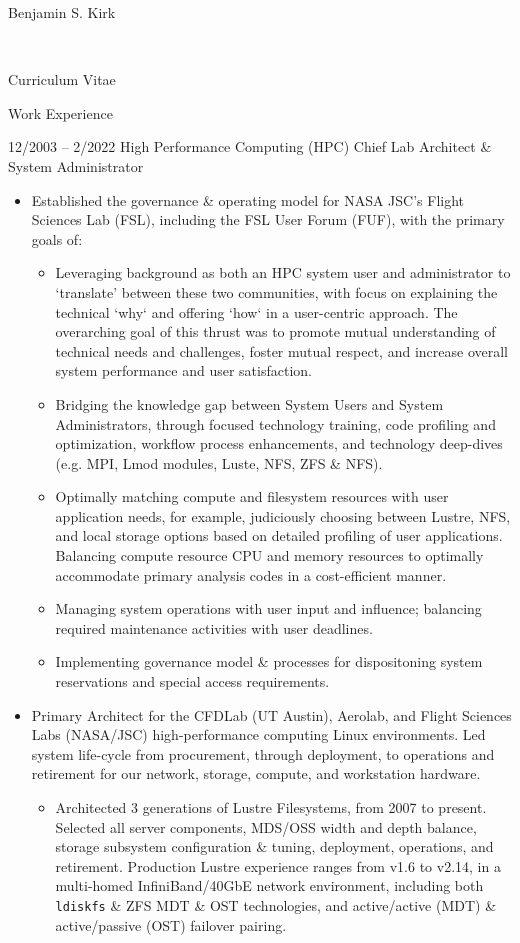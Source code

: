 \documentclass[10pt]{report}
\begin{document}
\begin{cv}{\centerline{\Large Benjamin S. Kirk}\\
    \centerline{\large Curriculum Vitae}}
\begin{cvlist}{Work Experience}
  \item[12/2003 -- 2/2022]
    High Performance Computing (HPC) Chief Lab Architect \& System Administrator
    \begin{itemize}
      \item
        Established the governance \& operating model for NASA JSC's Flight  Sciences Lab (FSL), including the FSL User Forum (FUF), with the primary goals of:
        \begin{itemize}
        \item
          Leveraging background as both an HPC system user and administrator to `translate' between these two communities, with focus on explaining the technical `why` and offering `how` in a user-centric approach. The overarching goal of this thrust was to promote mutual understanding of technical needs and challenges, foster mutual respect, and increase overall system performance and user satisfaction.
        \item
          Bridging the knowledge gap between System Users and System Administrators, through focused technology training, code profiling and optimization, workflow process enhancements, and technology deep-dives (e.g. MPI, Lmod modules, Luste, NFS, ZFS \& NFS).
        \item
          Optimally matching compute and filesystem resources with user application needs, for example, judiciously choosing between Lustre, NFS, and local storage options based on detailed profiling of user applications.  Balancing compute resource CPU and memory resources to optimally accommodate primary analysis codes in a cost-efficient manner.
        \item
          Managing system operations with user input and influence; balancing required maintenance activities with user deadlines.
        \item
          Implementing governance model \& processes for dispositoning system reservations and special access requirements.
        \end{itemize}
      \item
        Primary Architect for the CFDLab (UT Austin), Aerolab, and Flight Sciences Labs (NASA/JSC) high-performance computing Linux environments. Led system life-cycle from procurement, through deployment, to operations and retirement for our network, storage, compute, and workstation hardware.
    \begin{itemize}
      \item
        Architected 3 generations of Lustre Filesystems, from 2007 to present.  Selected all server components, MDS/OSS width and depth balance, storage subsystem configuration \& tuning, deployment, operations, and retirement.  Production Lustre experience ranges from v1.6 to v2.14, in a multi-homed InfiniBand/40GbE network environment, including both \texttt{ldiskfs} \& ZFS MDT \& OST technologies, and active/active (MDT) \& active/passive (OST) failover pairing.

\end{itemize}
\end{itemize}
\end{cvlist}
\end{cv}
\end{document}
